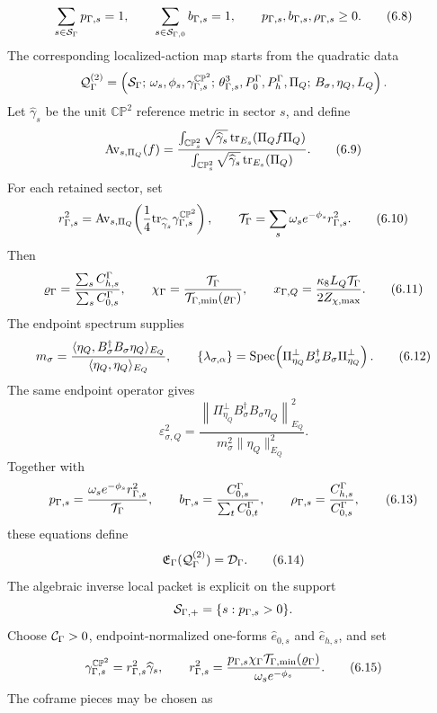 \documentclass[11pt]{article}
\theoremstyle{definition}
\theoremstyle{remark}
\newcommand{\CP}{\mathbb{CP}}
\begin{document}
\[
  \sum_{s\in{\cal S}_\Gamma}p_{\Gamma,s}=1,
  \qquad
  \sum_{s\in{\cal S}_{\Gamma,0}}b_{\Gamma,s}=1,
  \qquad
  p_{\Gamma,s},b_{\Gamma,s},\rho_{\Gamma,s}\ge0 .
  \tag{6.8}
\]
The corresponding localized-action map starts from the quadratic data
\[
  {\cal Q}_\Gamma^{(2)}
  =
  \left(
  {\cal S}_\Gamma;\,
  \omega_s,\phi_s,\gamma_{\Gamma,s}^{\CP^2};\,
  \theta_{\Gamma,s}^3,P_0^\Gamma,P_h^\Gamma,\Pi_Q;\,
  B_\sigma,\eta_Q,L_Q
  \right).
\]
Let \(\widehat\gamma_s\) be the unit \(\CP^2\) reference metric in sector
\(s\), and define
\[
  {\rm Av}_{s,\Pi_Q}(f)
  =
  \frac{
  \int_{\CP^2_s}\sqrt{\widehat\gamma_s}\,
  {\rm tr}_{E_s}(\Pi_Qf\Pi_Q)}
  {\int_{\CP^2_s}\sqrt{\widehat\gamma_s}\,
  {\rm tr}_{E_s}(\Pi_Q)} .
  \tag{6.9}
\]
For each retained sector, set
\[
  r_{\Gamma,s}^2
  =
  {\rm Av}_{s,\Pi_Q}\!\left(
  \frac14{\rm tr}_{\widehat\gamma_s}
  \gamma_{\Gamma,s}^{\CP^2}
  \right),
  \qquad
  {\cal T}_\Gamma
  =
  \sum_s\omega_s e^{-\phi_s}r_{\Gamma,s}^2 .
  \tag{6.10}
\]
Then
\[
  \varrho_\Gamma
  =
  \frac{\sum_sC_{h,s}^\Gamma}{\sum_sC_{0,s}^\Gamma},
  \qquad
  \chi_\Gamma
  =
  \frac{{\cal T}_\Gamma}
  {{\cal T}_{\Gamma,\min}(\varrho_\Gamma)},
  \qquad
  x_{\Gamma,Q}
  =
  \frac{\kappa_8L_Q{\cal T}_\Gamma}{2Z_{\chi,\max}} .
  \tag{6.11}
\]
The endpoint spectrum supplies
\[
  m_\sigma
  =
  \frac{\langle\eta_Q,B_\sigma^\dagger B_\sigma\eta_Q\rangle_{E_Q}}
  {\langle\eta_Q,\eta_Q\rangle_{E_Q}},
  \qquad
  \{\lambda_{\sigma,\alpha}\}
  =
  {\rm Spec}\!
  \left(
  \Pi_{\eta_Q}^{\perp}B_\sigma^\dagger B_\sigma
  \Pi_{\eta_Q}^{\perp}
  \right).
  \tag{6.12}
\]
The same endpoint operator gives
\[
  \varepsilon_{\sigma,Q}^2
  =
  \frac{
  \left\|
  \Pi_{\eta_Q}^\perp B_\sigma^\dagger B_\sigma\eta_Q
  \right\|_{E_Q}^2}
  {m_\sigma^2\|\eta_Q\|_{E_Q}^2}.
\]
Together with
\[
  p_{\Gamma,s}
  =
  \frac{\omega_s e^{-\phi_s}r_{\Gamma,s}^2}
  {{\cal T}_\Gamma},
  \qquad
  b_{\Gamma,s}
  =
  \frac{C_{0,s}^\Gamma}{\sum_tC_{0,t}^\Gamma},
  \qquad
  \rho_{\Gamma,s}
  =
  \frac{C_{h,s}^\Gamma}{C_{0,s}^\Gamma},
  \tag{6.13}
\]
these equations define
\[
  {\mathfrak E}_\Gamma({\cal Q}_\Gamma^{(2)})
  =
  {\cal D}_\Gamma .
  \tag{6.14}
\]
The algebraic inverse local packet is explicit on the support
\[
  {\cal S}_{\Gamma,+}=\{s:p_{\Gamma,s}>0\}.
\]
Choose \({\cal C}_\Gamma>0\), endpoint-normalized one-forms
\(\widehat e_{0,s}\) and \(\widehat e_{h,s}\), and set
\[
  \gamma_{\Gamma,s}^{\CP^2}=r_{\Gamma,s}^2\widehat\gamma_s,
  \qquad
  r_{\Gamma,s}^2
  =
  \frac{p_{\Gamma,s}\chi_\Gamma
  {\cal T}_{\Gamma,\min}(\varrho_\Gamma)}
  {\omega_s e^{-\phi_s}} .
  \tag{6.15}
\]
The coframe pieces may be chosen as
\end{document}
